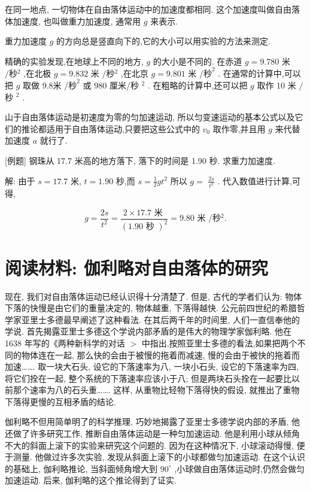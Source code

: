 \documentclass[10pt]{article}
\begin{document}
在同一地点, 一切物体在自由落体运动中的加速度都相同. 这个加速度叫做自由落体加速度, 也叫做重力加速度, 通常用 \(g\) 来表示.

重力加速度 \(g\) 的方向总是竖直向下的,它的大小可以用实验的方法来测定.

精确的实验发现,在地球上不同的地方, \(g\) 的大小是不同的. 在赤道 \(g = {9.780}\) 米 \(/秒{}^{2}\) ,在北极 \(g = {9.832}\) 米 \(/秒{}^{2}\) ,在北京 \(g = {9.801}\) 米 \(/{\text{秒}}^{2}\) . 在通常的计算中,可以把 \(g\) 取做 9.8米 \(/{\text{秒}}^{2}\) 或 980 厘米/秒 \({}^{2}\) . 在粗略的计算中,还可以把 \(g\) 取作 10 米 \(/\) 秒 \({}^{2}\) .

山于自由落体运动是初速度为零的匀加速运动, 所以匀变速运动的基本公式以及它们的推论都适用于自由落体运动,只要把这些公式中的 \({v}_{0}\) 取作零,并且用 \(g\) 来代替加速度 \(a\) 就行了.

[例题] 钢珠从 17.7 米高的地方落下, 落下的时间是 1.90 秒. 求重力加速度.

解: 由于 \(s = {17.7}\) 米, \(t = {1.90}\) 秒,而 \(s = \frac{1}{2}g{t}^{2}\) 所以 \(g =\) \(\frac{2s}{{t}^{2}}\) . 代入数值进行计算,可得,

\[
g = \frac{2s}{{t}^{2}} = \frac{2 \times {17.7}\text{ 米 }}{{\left( {1.90}\text{ 秒 }\right) }^{2}} = {9.80}\text{ 米 }/秒{}^{2}.
\]

\section*{阅读材料: 伽利略对自由落体的研究}

现在, 我们对自由落体运动已经认识得十分清楚了. 但是, 古代的学者们认为: 物体下落的快慢是由它们的重量决定的, 物体越重, 下落得越快. 公元前四世纪的希腊哲学家亚里士多德最早阐述了这种看法. 在其后两千年的时间里, 人们一直信奉他的学说. 首先揭露亚里士多德这个学说内部矛盾的是伟大的物理学家伽利略. 他在 1638 年写的《两种新科学的对话 \(>\) 中指出,按照亚里士多德的看法,如果把两个不同的物体连在一起, 那么快的会由于被慢的拖着而减速, 慢的会由于被快的拖着而加速……. 取一块大石头, 设它的下落速率为八, 一块小石头, 设它的下落速率为四, 将它们拴在一起, 整个系统的下落速率应该小于八; 但是两块石头拴在一起要比以前那个速率为八的石头重……. 这样, 从重物比轻物下落得快的假设, 就推出了重物下落得更慢的互相矛盾的结论.

伽利略不但用简单明了的科学推理, 巧妙地揭露了亚里士多德学说内部的矛盾, 他还做了许多研究工作, 推断自由落体运动是一种匀加速运动. 他是利用小球从倾角不大的斜面上滚下的实验来研究这个问题的. 因为在这种情况下, 小球滚动得慢, 便于测量. 他做过许多次实验, 发现从斜面上滚下的小球都做匀加速运动. 在这个认识的基础上, 伽利略推论, 当斜面倾角增大到 \({90}^{ \circ }\) ,小球做自由落体运动时,仍然会做匀加速运动. 后来, 伽利略的这个推论得到了证实.
\end{document}
